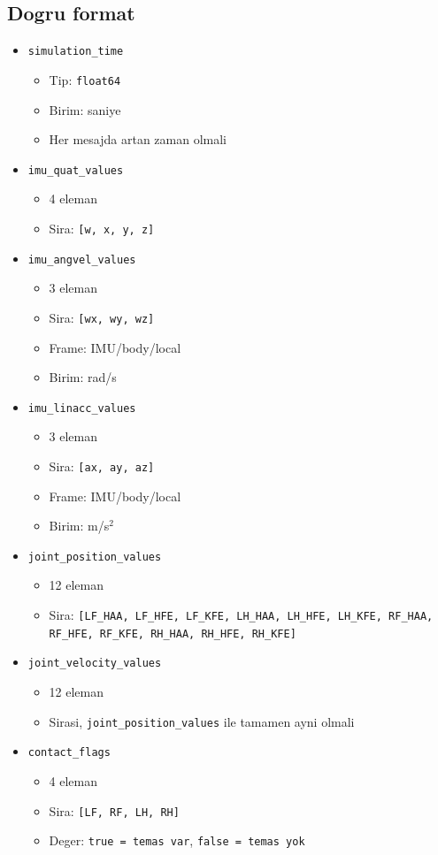 \documentclass[11pt,a4paper]{article}
\begin{document}
\subsection*{Dogru format}
\begin{itemize}
  \item \texttt{simulation\_time}
  \begin{itemize}
    \item Tip: \texttt{float64}
    \item Birim: saniye
    \item Her mesajda artan zaman olmali
  \end{itemize}
  \item \texttt{imu\_quat\_values}
  \begin{itemize}
    \item 4 eleman
    \item Sira: \texttt{[w, x, y, z]}
  \end{itemize}
  \item \texttt{imu\_angvel\_values}
  \begin{itemize}
    \item 3 eleman
    \item Sira: \texttt{[wx, wy, wz]}
    \item Frame: IMU/body/local
    \item Birim: rad/s
  \end{itemize}
  \item \texttt{imu\_linacc\_values}
  \begin{itemize}
    \item 3 eleman
    \item Sira: \texttt{[ax, ay, az]}
    \item Frame: IMU/body/local
    \item Birim: m/s$^2$
  \end{itemize}
  \item \texttt{joint\_position\_values}
  \begin{itemize}
    \item 12 eleman
    \item Sira:
    \texttt{[LF\_HAA, LF\_HFE, LF\_KFE, LH\_HAA, LH\_HFE, LH\_KFE, RF\_HAA, RF\_HFE, RF\_KFE, RH\_HAA, RH\_HFE, RH\_KFE]}
  \end{itemize}
  \item \texttt{joint\_velocity\_values}
  \begin{itemize}
    \item 12 eleman
    \item Sirasi, \texttt{joint\_position\_values} ile tamamen ayni olmali
  \end{itemize}
  \item \texttt{contact\_flags}
  \begin{itemize}
    \item 4 eleman
    \item Sira: \texttt{[LF, RF, LH, RH]}
    \item Deger: \texttt{true = temas var}, \texttt{false = temas yok}
  \end{itemize}
\end{itemize}
\end{document}
